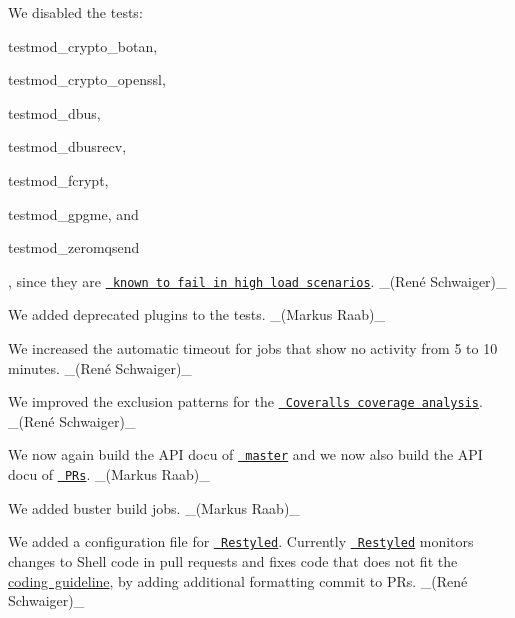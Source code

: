 \begin{DoxyItemize}
\item We disabled the tests\+:
\begin{DoxyItemize}
\item {\ttfamily testmod\+\_\+crypto\+\_\+botan},
\item {\ttfamily testmod\+\_\+crypto\+\_\+openssl},
\item {\ttfamily testmod\+\_\+dbus},
\item {\ttfamily testmod\+\_\+dbusrecv},
\item {\ttfamily testmod\+\_\+fcrypt},
\item {\ttfamily testmod\+\_\+gpgme}, and
\item {\ttfamily testmod\+\_\+zeromqsend}
\end{DoxyItemize}

, since they are \href{https://issues.libelektra.org/2439}{\texttt{ known to fail in high load scenarios}}. \+\_\+(René Schwaiger)\+\_\+
\item We added deprecated plugins to the tests. \+\_\+(\+Markus Raab)\+\_\+
\item We increased the automatic timeout for jobs that show no activity from 5 to 10 minutes. \+\_\+(René Schwaiger)\+\_\+
\item We improved the exclusion patterns for the \href{https://coveralls.io/github/ElektraInitiative/libelektra}{\texttt{ Coveralls coverage analysis}}. \+\_\+(René Schwaiger)\+\_\+
\item We now again build the A\+PI docu of \href{https://doc.libelektra.org/api/master}{\texttt{ master}} and we now also build the A\+PI docu of \href{https://doc.libelektra.org/api/pr/}{\texttt{ P\+Rs}}. \+\_\+(\+Markus Raab)\+\_\+
\item We added buster build jobs. \+\_\+(\+Markus Raab)\+\_\+
\end{DoxyItemize}


\begin{DoxyItemize}
\item We added a configuration file for \href{https://restyled.io}{\texttt{ Restyled}}. Currently \href{https://restyled.io}{\texttt{ Restyled}} monitors changes to Shell code in pull requests and fixes code that does not fit the \mbox{\hyperlink{doc_CODING_md}{coding guideline}}, by adding additional formatting commit to P\+Rs. \+\_\+(René Schwaiger)\+\_\+
\end{DoxyItemize}



